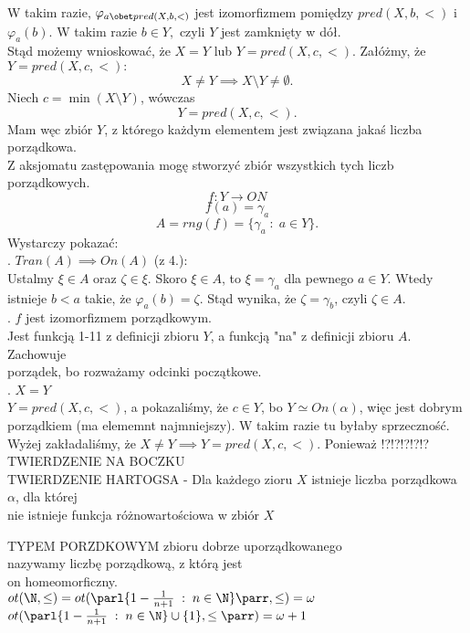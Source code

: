 W takim razie, $\varphi_{a \obet pred(X, b, <)}$ jest izomorfizmem pomiędzy $pred(X, b, <)$ i $\varphi_a(b)$. W takim razie $b\in Y,$ czyli $Y$ jest zamknięty w dół.\medskip\\
Stąd możemy wnioskować, że $X=Y$ lub $Y=pred(X, c, <)$. Załóżmy, że $Y=pred(X, c, <):$
$$X\neq Y\implies X\setminus Y\neq\emptyset.$$
Niech $c=\min(X\setminus Y)$, wówczas 
$$Y=pred(X, c, <).$$
Mam węc zbiór $Y$, z którego każdym elementem jest związana jakaś liczba porządkowa. \\Z aksjomatu zastępowania mogę stworzyć zbiór wszystkich tych liczb porządkowych.
$$f:Y\to ON$$
$$f(a)=\gamma_a$$
$$A=rng(f)=\{\gamma_a\;:\;a\in Y\}.$$
Wystarczy pokazać:\medskip\\
. $Tran(A)\implies On(A)$ (z 4.):\smallskip\\
Ustalmy $\xi\in A$ oraz $\zeta\in \xi$. Skoro $\xi\in A$, to $\xi=\gamma_a$ dla pewnego $a\in Y$. Wtedy istnieje $b<a$ takie, że $\varphi_a(b)=\zeta$. Stąd wynika, że $\zeta=\gamma_b$, czyli $\zeta\in A$.\medskip\\
. $f$ jest izomorfizmem porządkowym.\smallskip\\
Jest funkcją 1-11 z definicji zbioru $Y$, a funkcją "na" z definicji zbioru $A$. Zachowuje \\porządek, bo rozważamy odcinki początkowe.\medskip\\
. $X=Y$ \smallskip\\
$Y=pred(X, c, <)$, a {\color{emp}pokazaliśmy, że $c\in Y$, bo $Y\simeq On(\alpha)$, więc jest dobrym porządkiem (ma elememnt najmniejszy)}. W takim razie tu byłaby sprzeczność.\\
Wyżej zakładaliśmy, że $X\neq Y\implies Y=pred(X, c, <)$. Ponieważ !?!?!?!?!?
\kondow
{\color{dygresyja}TWIERDZENIE NA BOCZKU}\smallskip\\
{\color{acc}TWIERDZENIE HARTOGSA} - Dla każdego zioru $X$ istnieje liczba porządkowa $\alpha$, dla której \\nie istnieje funkcja różnowartościowa w zbiór $X$\bigskip\\
\bigskip
\begin{center}\large
    {\color{def}TYPEM PORZDKOWYM} zbioru dobrze uporządkowanego \\nazywamy liczbę porządkową, z którą jest \\on homeomorficzny.\smallskip\\
    $ot(\N,\leq)=ot(\parl\{1-\frac1{n+1}\;:\;n\in\N\}\parr,\leq)=\omega$\smallskip\\
    $ot (\parl\{1-\frac1{n+1}\;:\;n\in\N\}\cup\{1\},\leq\parr)=\omega+1$
\end{center}